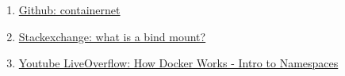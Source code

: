 \documentclass[12pt]{article}
\begin{document}
\begin{enumerate}
		\item 
		\label{bib: containernet github}
		\href{https://github.com/containernet/containernet}{Github: containernet}
		
		\item 
		\label{bib: what is bind}
		\href{https://unix.stackexchange.com/questions/198590/what-is-a-bind-mount}{Stackexchange: what is a bind mount?}
		
		\item
		\label{bib: docker works namespaces}
		\href{https://www.youtube.com/watch?v=-YnMr1lj4Z8}{Youtube LiveOverflow: How Docker Works - Intro to Namespaces}
		
		
		
	\end{enumerate}

	\pagebreak
\end{document}

